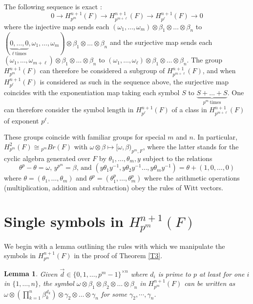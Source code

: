 \documentclass[preprint, 10pt, english]{elsarticle}
\newtheorem{lem}[thm]{Lemma}
\theoremstyle{definition}
\begin{document}
The following sequence is exact \cite[Theorem 2.31 together with Remark 2.32]{AravireJacobORyan:2018}: 
\begin{equation}0 \rightarrow H_{p^m}^{n+1}(F) \rightarrow H_{p^{m+\ell}}^{n+1}(F) \rightarrow H_{p^\ell}^{n+1}(F) \rightarrow 0
\label{e1}
\end{equation}
where the injective map sends each $(\omega_1,\dots,\omega_m) \otimes \beta_1 \otimes \dots \otimes \beta_n$ to $(\underbrace{0,\dots,0}_{\ell \ \text{times}},\omega_1,\dots,\omega_m) \otimes \beta_1 \otimes \dots \otimes \beta_n$ and the surjective map sends each $(\omega_1,\dots,\omega_{m+\ell})\otimes \beta_1 \otimes \dots \otimes \beta_n$ to $(\omega_1,\dots,\omega_\ell) \otimes \beta_1 \otimes \dots \otimes \beta_n$.
The group $H_{p^m}^{n+1}(F)$ can therefore be considered a subgroup of $H_{p^{m+\ell}}^{n+1}(F)$, and when $H_{p^\ell}^{n+1}(F)$ is considered as such in the sequence above, the surjective map coincides with the exponentiation map taking each symbol $S$ to $\underbrace{S+\dots+S}_{p^m \ \text{times}}$. One can therefore consider the symbol length in $H_{p^\ell}^{n+1}(F)$ of a class in $H_{p^{m+\ell}}^{n+1}(F)$ of exponent $p^\ell$.

These groups coincide with familiar groups for special $m$ and $n$. In particular, $H_{p^m}^2(F) \cong {_{p^m}Br}(F)$ with $\omega \otimes \beta \mapsto [\omega,\beta)_{p^m,F}$, where the latter stands for the cyclic algebra generated over $F$ by $\theta_1,\dots,\theta_m,y$ subject to the relations 
\[\theta^p-\theta=\omega, \, y^{p^m}=\beta \textrm{, and } (y \theta_1 y^{-1},y \theta_2 y^{-1}\dots,y \theta_m y^{-1})=\theta+(1,0,\dots,0)\]
where  $\theta=(\theta_1,\dots,\theta_m)$ and $\theta^p=(\theta_1^p,\dots,\theta_m^p)$ where the arithmetic operations (multiplication, addition and subtraction) obey the rules of Witt vectors.


\section{Single symbols in $H_{p^m}^{n+1}(F)$}

We begin with a lemma outlining the rules with which we manipulate the symbols in $H_{p^m}^{n+1}(F)$ in the proof of Theorem \ref{T3}.

\begin{lem}\label{ourlemma2} Given $\vec{d}\in \{0,1,\dots,p^m-1\}^{\times n}$ where $d_i$ is prime to $p$ at least for one $i$ in $\{1,\dots,n\}$, the symbol $\omega \otimes \beta_1 \otimes \beta_2 \otimes \dots \otimes \beta_n$ in $H_{p^m}^{n+1}(F)$ can be written as $\omega \otimes (\prod_{k=1}^n \beta_k^{d_k}) \otimes \gamma_2 \otimes \dots \otimes \gamma_n$ for some $\gamma_2,\dotsm,\gamma_n$.
\end{lem}
\end{document}
